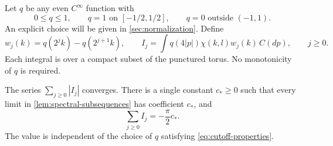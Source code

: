 Let \(q\) be any even \(C^\infty\) function with
\begin{equation}
 \label{eq:cutoff-properties}
 0\le q\le1,\qquad q=1\text{ on }[-1/2,1/2],\qquad
 q=0\text{ outside }(-1,1).
\end{equation}
An explicit choice will be given in \cref{sec:normalization}. Define
\[
 w_j(k)=q(2^jk)-q(2^{j+1}k),\qquad
 I_j=\int q(4|p|)\chi(k,l)w_j(k)\,C(dp),\qquad j\ge0.
\]
Each integral is over a compact subset of the punctured torus. No monotonicity
of \(q\) is required.

\begin{proposition}
\label{prop:angular-sum}
The series \(\sum_{j\ge0}|I_j|\) converges. There is a single constant
\(c_*\ge0\) such that every limit in \cref{lem:spectral-subsequences} has
coefficient \(c_*\), and
\begin{equation}
 \label{eq:angular-sum}
 \sum_{j\ge0}I_j=-\frac\pi2 c_*.
\end{equation}
The value is independent of the choice of \(q\) satisfying
\cref{eq:cutoff-properties}.
\end{proposition}

